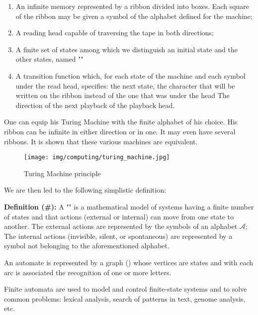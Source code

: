 	\begin{enumerate}
		\item An infinite memory represented by a ribbon divided into boxes. Each square of the ribbon may be given a symbol of the alphabet defined for the machine;
	
		\item A reading head capable of traversing the tape in both directions;
	
		\item A finite set of states among which we distinguish an initial state and the other states, named ""
	
		\item A transition function which, for each state of the machine and each symbol under the read head, specifies: the next state, the character that will be written on the ribbon instead of the one that was under the head The direction of the next playback of the playback head.
	\end{enumerate}
	One can equip his Turing Machine with the finite alphabet of his choice. His ribbon can be infinite in either direction or in one. It may even have several ribbons. It is shown that these various machines are equivalent.
	\begin{figure}[H]
		\centering
		\texttt{[image: img/computing/turing\_machine.jpg]}
		\caption{Turing Machine principle}
	\end{figure}
	We are then led to the following simplistic definition:
	
	\textbf{Definition (\#\mydef):}
	A "" is a mathematical model of systems having a finite number of states and that actions (external or internal) can move from one state to another. The external actions are represented by the symbols of an alphabet $\mathcal{A}$; The internal actions (invisible, silent, or spontaneous) are represented by a symbol not belonging to the aforementioned alphabet.

	An automate is represented by a graph () whose vertices are states and with each arc is associated the recognition of one or more letters.

	Finite automata are used to model and control finite-state systems and to solve common problems: lexical analysis, search of patterns in text, genome analysis, etc.
	
